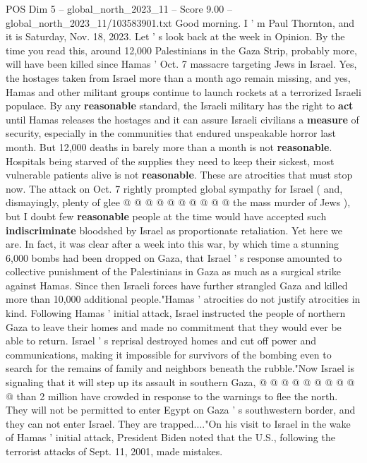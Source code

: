\begin{textsample}{POS Dim 5 – global\_north\_2023\_11 – Score 9.00 – global\_north\_2023\_11/103583901.txt}  \label{ex:f5_pos_419}
Good morning.
I ' m Paul Thornton, and it is Saturday, Nov. 18, 2023.
Let ' s look back at the week in Opinion.
By the time you read this, around 12,000 Palestinians in the Gaza Strip, probably more, will have been killed since Hamas ' Oct. 7 massacre targeting Jews in Israel.
Yes, the hostages taken from Israel more than a month ago remain missing, and yes, Hamas and other militant groups continue to launch rockets at a terrorized Israeli populace.
By any \textbf{reasonable} standard, the Israeli military has the right to \textbf{act} until Hamas releases the hostages and it can assure Israeli civilians a \textbf{measure} of security, especially in the communities that endured unspeakable horror last month.
But 12,000 deaths in barely more than a month is not \textbf{reasonable}.
Hospitals being starved of the supplies they need to keep their sickest, most vulnerable patients alive is not \textbf{reasonable}.
These are atrocities that must stop now.
The attack on Oct. 7 rightly prompted global sympathy for Israel ( and, dismayingly, plenty of glee @ @ @ @ @ @ @ @ @ @ the mass murder of Jews ), but I doubt few \textbf{reasonable} people at the time would have accepted such \textbf{indiscriminate} bloodshed by Israel as proportionate retaliation.
Yet here we are.
In fact, it was clear after a week into this war, by which time a stunning 6,000 bombs had been dropped on Gaza, that Israel ' s response amounted to collective punishment of the Palestinians in Gaza as much as a surgical strike against Hamas.
Since then Israeli forces have further strangled Gaza and killed more than 10,000 additional people."Hamas ' atrocities do not justify atrocities in kind.
Following Hamas ' initial attack, Israel instructed the people of northern Gaza to leave their homes and made no commitment that they would ever be able to return.
Israel ' s reprisal destroyed homes and cut off power and communications, making it impossible for survivors of the bombing even to search for the remains of family and neighbors beneath the rubble."Now Israel is signaling that it will step up its assault in southern Gaza, @ @ @ @ @ @ @ @ @ @ than 2 million have crowded in response to the warnings to flee the north.
They will not be permitted to enter Egypt on Gaza ' s southwestern border, and they can not enter Israel.
They are trapped...."On his visit to Israel in the wake of Hamas ' initial attack, President Biden noted that the U.S., following the terrorist attacks of Sept. 11, 2001, made mistakes.

\end{textsample}
